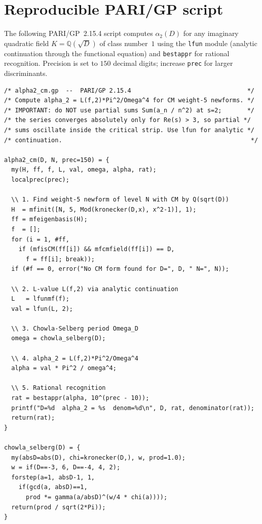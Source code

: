 \documentclass[12pt]{amsart}
\theoremstyle{definition}
\newcommand{\Q}{\mathbb{Q}}
\begin{document}
\appendix

\section{Reproducible PARI/GP script}\label{sec:pari}

The following PARI/GP~2.15.4 script computes $\alpha_2(D)$ for any
imaginary quadratic field $K = \Q(\sqrt{D})$ of class number~$1$
using the \texttt{lfun} module (analytic continuation through the
functional equation) and \texttt{bestappr} for rational recognition.
Precision is set to $150$ decimal digits; increase \texttt{prec} for
larger discriminants.

\begin{verbatim}
/* alpha2_cm.gp  --  PARI/GP 2.15.4                                */
/* Compute alpha_2 = L(f,2)*Pi^2/Omega^4 for CM weight-5 newforms. */
/* IMPORTANT: do NOT use partial sums Sum(a_n / n^2) at s=2;       */
/* the series converges absolutely only for Re(s) > 3, so partial */
/* sums oscillate inside the critical strip. Use lfun for analytic */
/* continuation.                                                    */

alpha2_cm(D, N, prec=150) = {
  my(H, ff, f, L, val, omega, alpha, rat);
  localprec(prec);

  \\ 1. Find weight-5 newform of level N with CM by Q(sqrt(D))
  H  = mfinit([N, 5, Mod(kronecker(D,x), x^2-1)], 1);
  ff = mfeigenbasis(H);
  f  = [];
  for (i = 1, #ff,
    if (mfisCM(ff[i]) && mfcmfield(ff[i]) == D,
      f = ff[i]; break));
  if (#f == 0, error("No CM form found for D=", D, " N=", N));

  \\ 2. L-value L(f,2) via analytic continuation
  L   = lfunmf(f);
  val = lfun(L, 2);

  \\ 3. Chowla-Selberg period Omega_D
  omega = chowla_selberg(D);

  \\ 4. alpha_2 = L(f,2)*Pi^2/Omega^4
  alpha = val * Pi^2 / omega^4;

  \\ 5. Rational recognition
  rat = bestappr(alpha, 10^(prec - 10));
  printf("D=%d  alpha_2 = %s  denom=%d\n", D, rat, denominator(rat));
  return(rat);
}

chowla_selberg(D) = {
  my(absD=abs(D), chi=kronecker(D,), w, prod=1.0);
  w = if(D==-3, 6, D==-4, 4, 2);
  forstep(a=1, absD-1, 1,
    if(gcd(a, absD)==1,
      prod *= gamma(a/absD)^(w/4 * chi(a))));
  return(prod / sqrt(2*Pi));
}


\end{verbatim}
\end{document}
